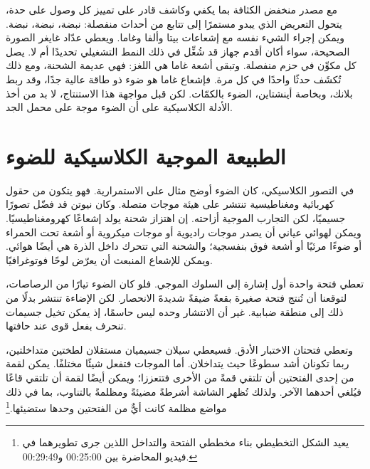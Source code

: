 مع مصدر منخفض الكثافة بما يكفي وكاشف قادر على تمييز كل وصول على حدة، يتحول التعريض الذي يبدو مستمرًا إلى تتابع من أحداث منفصلة: نبضة، نبضة، نبضة. ويمكن إجراء الشيء نفسه مع إشعاعات بيتا وألفا وغاما. ويعطي عدّاد غايغر الصورة الصحيحة، سواء أكان أقدم جهاز قد شُغِّل في ذلك النمط التشغيلي تحديدًا أم لا. يصل كل مكوِّن في حزم منفصلة. وتبقى أشعة غاما هي اللغز: فهي عديمة الشحنة، ومع ذلك تُكشَف حدثًا واحدًا في كل مرة. فإشعاع غاما هو ضوء ذو طاقة عالية جدًا، وقد ربط بلانك، وبخاصة أينشتاين، الضوء بالكمّات. لكن قبل مواجهة هذا الاستنتاج، لا بد من أخذ الأدلة الكلاسيكية على أن الضوء موجة على محمل الجد.

\section{الطبيعة الموجية الكلاسيكية للضوء}

في التصور الكلاسيكي، كان الضوء أوضح مثال على الاستمرارية. فهو يتكون من حقول كهربائية ومغناطيسية تنتشر على هيئة موجات متصلة. وكان نيوتن قد فضّل تصورًا جسيميًا، لكن التجارب الموجية أزاحته. إن اهتزاز شحنة يولد إشعاعًا كهرومغناطيسيًا. ويمكن لهوائي عياني أن يصدر موجات راديوية أو موجات ميكروية أو أشعة تحت الحمراء أو ضوءًا مرئيًا أو أشعة فوق بنفسجية؛ والشحنة التي تتحرك داخل الذرة هي أيضًا هوائي. ويمكن للإشعاع المنبعث أن يعرّض لوحًا فوتوغرافيًا.

تعطي فتحة واحدة أول إشارة إلى السلوك الموجي. فلو كان الضوء تيارًا من الرصاصات، لتوقعنا أن تُنتج فتحة صغيرة بقعةً ضيقةً شديدةَ الانحصار. لكن الإضاءة تنتشر بدلًا من ذلك إلى منطقة ضبابية. غير أن الانتشار وحده ليس حاسمًا، إذ يمكن تخيل جسيمات تنحرف بفعل قوى عند حافتها.

وتعطي فتحتان الاختبار الأدق. فسيعطي سيلان جسيميان مستقلان لطختين متداخلتين، ربما تكونان أشد سطوعًا حيث يتداخلان. أما الموجات فتفعل شيئًا مختلفًا. يمكن لقمة من إحدى الفتحتين أن تلتقي قمةً من الأخرى فتتعززا؛ ويمكن أيضًا لقمة أن تلتقي قاعًا فيُلغي أحدهما الآخر. ولذلك تُظهر الشاشة أشرطةً مضيئةً ومظلمةً بالتناوب، بما في ذلك مواضع مظلمة كانت أيٌّ من الفتحتين وحدها ستضيئها.\footnote{يعيد الشكل التخطيطي بناء مخططي الفتحة والتداخل اللذين جرى تطويرهما في فيديو المحاضرة بين 00:25:00 و00:29:49.}

